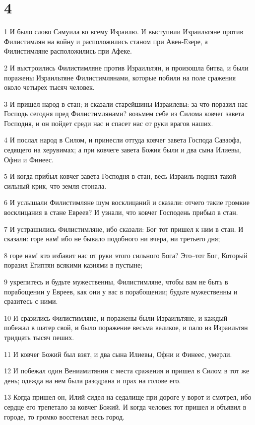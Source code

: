 \chapter{4}

\par 1 И было слово Самуила ко всему Израилю. И выступили Израильтяне против Филистимлян на войну и расположились станом при Авен-Езере, а Филистимляне расположились при Афеке.
\par 2 И выстроились Филистимляне против Израильтян, и произошла битва, и были поражены Израильтяне Филистимлянами, которые побили на поле сражения около четырех тысяч человек.
\par 3 И пришел народ в стан; и сказали старейшины Израилевы: за что поразил нас Господь сегодня пред Филистимлянами? возьмем себе из Силома ковчег завета Господня, и он пойдет среди нас и спасет нас от руки врагов наших.
\par 4 И послал народ в Силом, и принесли оттуда ковчег завета Господа Саваофа, седящего на херувимах; а при ковчеге завета Божия были и два сына Илиевы, Офни и Финеес.
\par 5 И когда прибыл ковчег завета Господня в стан, весь Израиль поднял такой сильный крик, что земля стонала.
\par 6 И услышали Филистимляне шум восклицаний и сказали: отчего такие громкие восклицания в стане Евреев? И узнали, что ковчег Господень прибыл в стан.
\par 7 И устрашились Филистимляне, ибо сказали: Бог тот пришел к ним в стан. И сказали: горе нам! ибо не бывало подобного ни вчера, ни третьего дня;
\par 8 горе нам! кто избавит нас от руки этого сильного Бога? Это--тот Бог, Который поразил Египтян всякими казнями в пустыне;
\par 9 укрепитесь и будьте мужественны, Филистимляне, чтобы вам не быть в порабощении у Евреев, как они у вас в порабощении; будьте мужественны и сразитесь с ними.
\par 10 И сразились Филистимляне, и поражены были Израильтяне, и каждый побежал в шатер свой, и было поражение весьма великое, и пало из Израильтян тридцать тысяч пеших.
\par 11 И ковчег Божий был взят, и два сына Илиевы, Офни и Финеес, умерли.
\par 12 И побежал один Вениамитянин с места сражения и пришел в Силом в тот же день; одежда на нем была разодрана и прах на голове его.
\par 13 Когда пришел он, Илий сидел на седалище при дороге у ворот и смотрел, ибо сердце его трепетало за ковчег Божий. И когда человек тот пришел и объявил в городе, то громко восстенал весь город.
